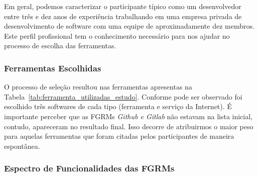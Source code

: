 Em geral, podemos caracterizar o participante típico como um desenvolvedor entre
três e dez anos de experiência trabalhando em uma empresa privada de
desenvolvimento de software com uma equipe de aproximadamente dez membros. Este
perfil profissional tem o conhecimento necessário para nos ajudar no processo de
escolha das ferramentas.

\subsubsection{Ferramentas Escolhidas}
\label{subsec:resultados_ferramentas_escolhidas}

O processo de seleção resultou nas ferramentas apresentas na
Tabela~\ref{tab:ferramenta_utilizadas_estudo}. Conforme pode ser observado foi
escolhido três softwares de cada tipo (ferramenta e serviço da Internet). É
importante perceber que as FGRMs \textit{Github e Gitlab} não estavam na lista
inicial, contudo, apareceram no resultado final. Isso decorre de atribuirmos o
maior peso para aquelas ferramentas que foram citadas pelos participantes de
maneira espontânea.

\begin{table}[htpb]
\centering
{}
\caption{Ferramentas utilizados no estudo}
\label{tab:ferramenta_utilizadas_estudo}
\end{table}


\subsubsection{Espectro de Funcionalidades das FGRMs}
\label{subsec:categorizacao_ferramentas}


